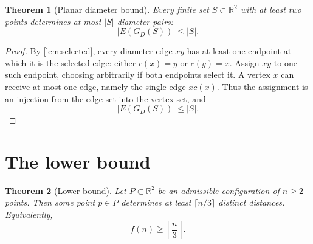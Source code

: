 \documentclass[11pt]{article}
\newtheorem{theorem}{Theorem}[section]
\theoremstyle{definition}
\theoremstyle{remark}
\newcommand{\R}{\mathbb{R}}
\begin{document}
\begin{theorem}[Planar diameter bound]\label{thm:diameter}
Every finite set $S\subset\R^2$ with at least two points determines at most $|S|$ diameter pairs:
\[
 |E(G_D(S))|\le |S|.
\]
\end{theorem}

\begin{proof}
By \cref{lem:selected}, every diameter edge $xy$ has at least one endpoint at which it is the selected edge: either $c(x)=y$ or $c(y)=x$.  Assign $xy$ to one such endpoint, choosing arbitrarily if both endpoints select it.  A vertex $x$ can receive at most one edge, namely the single edge $xc(x)$.  Thus the assignment is an injection from the edge set into the vertex set, and
\[
 |E(G_D(S))|\le|S|.
\]
\end{proof}

\section{The lower bound}\label{sec:lower}

\begin{theorem}[Lower bound]\label{thm:lower}
Let $P\subset\R^2$ be an admissible configuration of $n\ge2$ points.  Then some point $p\in P$ determines at least $\lceil n/3\rceil$ distinct distances.  Equivalently,
\[
 f(n)\ge\left\lceil\frac n3\right\rceil.
\]
\end{theorem}
\end{document}
